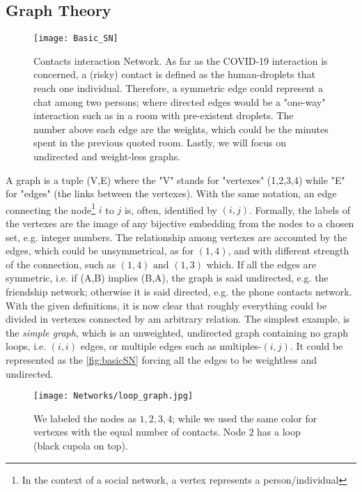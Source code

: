 \documentclass[a4paper,10pt, oneside]{book} %
\theoremstyle{definition}
\begin{document}
\subsection{Graph Theory}
\label{sec:GraphTheory}
\begin{figure}[htbp]
	\centering
	\texttt{[image: Basic\_SN]}
	\caption{Contacts interaction Network. As far as the COVID-19 interaction is concerned, a (risky) contact is defined as the human-droplets that reach one individual. Therefore, a symmetric edge could represent a chat among two persons; where directed edges would be a "one-way" interaction such as in a room with pre-existent droplets. The number above each edge are the weights, which could be the minutes spent in the previous quoted room. Lastly, we will focus on undirected and weight-less graphs.}
	\label{fig:basicSN}
\end{figure}

A graph is a tuple (V,E) where the "V" stands for "vertexes" (1,2,3,4) while "E" for "edges" (the links between the vertexes).
With the same notation, an edge connecting the node\footnote{In the context of a social network, a vertex represents a person/individual} $i$ to $j$ is, often, identified by $(i,j)$.
Formally, the labels of the vertexes are the image of any bijective embedding from the nodes to a chosen set, e.g. integer numbers. The relationship among vertexes are accounted by the edges, which could be unsymmetrical, as for $(1,4)$, and with different strength of the connection, such as $(1,4) \text{ and } (1,3)$ which. If all the edges are symmetric, i.e. if (A,B) implies (B,A), the graph is said undirected, e.g. the friendship network; otherwise it is said directed, e.g. the phone contacts network. 
With the given definitions, it is now clear that roughly everything could be divided in vertexes connected by am arbitrary relation.
The simplest example, is the \textit{simple graph}, which is an unweighted, undirected graph containing no graph loops, i.e. $(i,i)$ edges, or multiple edges such as multiples-$(i,j)$. It could be represented as the \autoref{fig:basicSN} forcing all the edges to be weightless and undirected.
\begin{figure}[ht]
	\centering
	\texttt{[image: Networks/loop\_graph.jpg]}
	\caption{We labeled the nodes as $1,2,3,4$; while we used the same color for vertexes with the equal number of contacts. Node $ 2$ has a loop (black cupola on top).}
	\label{fig:simple}
\end{figure}
\end{document}
